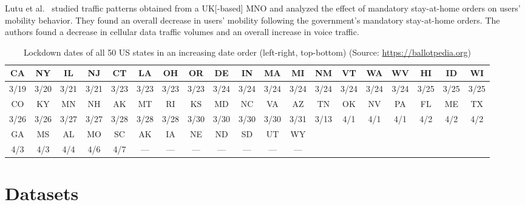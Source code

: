 \documentclass[conference,10pt]{IEEEtran}
\begin{document}

Lutu et al.~\cite{lutu2020characterization} studied traffic patterns obtained from a \gls{UK}[-based] \gls{MNO} and analyzed the effect of mandatory stay-at-home orders on users' mobility behavior. They found an overall decrease in users' mobility following the government’s mandatory stay-at-home orders. The authors found a decrease in cellular data traffic volumes and an overall increase in voice traffic.

\begin{table}
  \centering
  \caption{Lockdown dates of all 50 \gls{US} states in an increasing date order (left-right, top-bottom) (Source: \url{https://ballotpedia.org})}
  \label{tab:state-lockdown}
  \begin{tabular}{ |c|c|c|c|c|c|c|c|c|c|c|c|c|c|c|c|c|c|c| }
    \hline
    CA   & NY   & IL   & NJ   & CT   & LA   & OH   & OR   & DE   & IN   & MA   & MI   & NM   & VT   & WA   & WV   & HI   & ID   & WI   \\
    \hline
    3/19 & 3/20 & 3/21 & 3/21 & 3/23 & 3/23 & 3/23 & 3/23 & 3/24 & 3/24 & 3/24 & 3/24 & 3/24 & 3/24 & 3/24 & 3/24 & 3/25 & 3/25 & 3/25 \\
    \hline\hline
    CO   & KY   & MN   & NH   & AK   & MT   & RI   & KS   & MD   & NC   & VA   & AZ   & TN   & OK   & NV   & PA   & FL   & ME   & TX   \\
    \hline
    3/26 & 3/26 & 3/27 & 3/27 & 3/28 & 3/28 & 3/28 & 3/30 & 3/30 & 3/30 & 3/30 & 3/31 & 3/13 & 4/1  & 4/1  & 4/1  & 4/2  & 4/2  & 4/2  \\
    \hline\hline
    GA   & MS   & AL   & MO   & SC   & AK   & IA   & NE   & ND   & SD   & UT   & WY   & \multicolumn{7}{|c|}{}                         \\
    \hline
    4/3  & 4/3  & 4/4  & 4/6  & 4/7  & ---  & ---  & ---  & ---  & ---  & ---  & ---  & \multicolumn{7}{|c|}{}                         \\
    \hline
  \end{tabular}
\end{table}


\section{Datasets}\label{sec:datasets}
\end{document}
